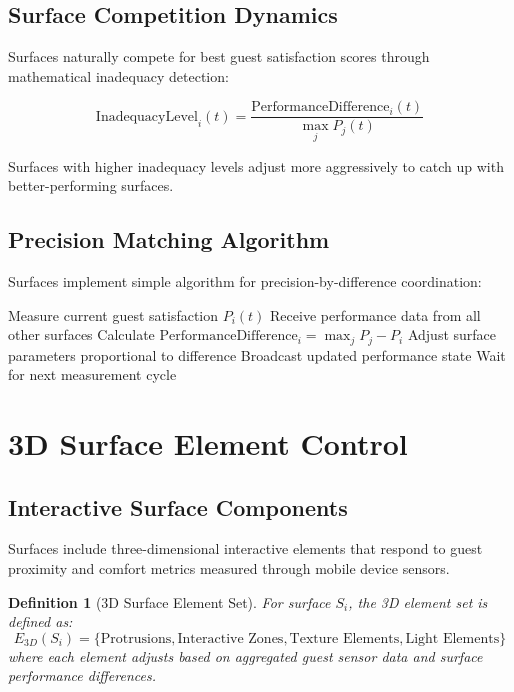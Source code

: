 \documentclass[12pt,a4paper]{article}
\newtheorem{definition}{Definition}
\begin{document}
\subsection{Surface Competition Dynamics}

Surfaces naturally compete for best guest satisfaction scores through mathematical inadequacy detection:

\begin{equation}
\text{InadequacyLevel}_i(t) = \frac{\text{PerformanceDifference}_i(t)}{\max_j P_j(t)}
\end{equation}

Surfaces with higher inadequacy levels adjust more aggressively to catch up with better-performing surfaces.

\subsection{Precision Matching Algorithm}

Surfaces implement simple algorithm for precision-by-difference coordination:

\begin{algorithm}
\caption{Surface Precision Matching}
\begin{algorithmic}[1]
\State Measure current guest satisfaction $P_i(t)$
\State Receive performance data from all other surfaces
\State Calculate $\text{PerformanceDifference}_i = \max_j P_j - P_i$
    \State Adjust surface parameters proportional to difference
    \State Broadcast updated performance state
\EndIf
\State Wait for next measurement cycle
\end{algorithmic}
\end{algorithm}

\section{3D Surface Element Control}

\subsection{Interactive Surface Components}

Surfaces include three-dimensional interactive elements that respond to guest proximity and comfort metrics measured through mobile device sensors.

\begin{definition}[3D Surface Element Set]
For surface $S_i$, the 3D element set is defined as:
\begin{equation}
E_{3D}(S_i) = \{\text{Protrusions}, \text{Interactive Zones}, \text{Texture Elements}, \text{Light Elements}\}
\end{equation}
where each element adjusts based on aggregated guest sensor data and surface performance differences.
\end{definition}
\end{document}
